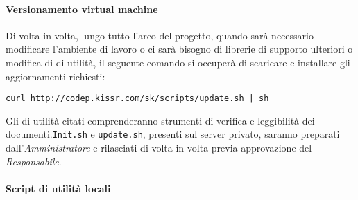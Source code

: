 \documentclass{scalatekids-article}
\begin{document}
\paragraph{Versionamento virtual machine}

Di volta in volta, lungo tutto l'arco del progetto, quando sarà necessario
modificare l'ambiente di lavoro o ci sarà bisogno di librerie di supporto
ulteriori o modifica di  di utilità, il seguente comando si
occuperà di scaricare e installare gli aggiornamenti richiesti:
\begin{center}
  \verb=curl http://codep.kissr.com/sk/scripts/update.sh | sh=
\end{center}
Gli  di utilità citati comprenderanno strumenti di verifica e
leggibilità dei documenti.\verb=Init.sh= e \verb=update.sh=,
presenti sul server privato, saranno preparati dall'\textit{Amministratore} e
rilasciati di volta in volta previa approvazione del \textit{Responsabile}.

\paragraph{Script di utilità locali}
\end{document}
